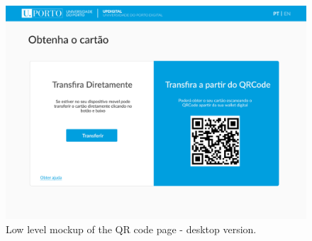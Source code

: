 \documentclass[10pt]{article}
\begin{document}
\begin{figure}[H]
  \centering
  \begin{minipage}{0.68\textwidth}
    \includegraphics[width=\linewidth]{report-images/qrcode-page-desktop.png}
    \caption{Low level mockup of the QR code page - desktop version.}
    \label{fig:fig-11}
  \end{minipage}
  \hfill
  \begin{minipage}{0.18\textwidth}

\end{minipage}
\end{figure}
\end{document}
